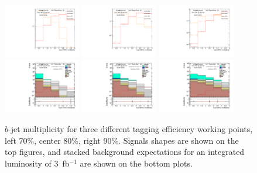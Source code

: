\begin{figure}[htb!!]
\begin{center}
\includegraphics[width=0.3\textwidth]{FIGURES/BTAGGING/02_CutLEP_ll_NB1JET_signals.pdf} 
\includegraphics[width=0.3\textwidth]{FIGURES/BTAGGING/02_CutLEP_ll_NB2JET_signals.pdf}
\includegraphics[width=0.3\textwidth]{FIGURES/BTAGGING/02_CutLEP_ll_NB3JET_signals.pdf}\\ 
\includegraphics[width=0.3\textwidth]{FIGURES/BTAGGING/05_CutSS_ll_NB1JET.pdf}
\includegraphics[width=0.3\textwidth]{FIGURES/BTAGGING/05_CutSS_ll_NB2JET.pdf}
\includegraphics[width=0.3\textwidth]{FIGURES/BTAGGING/05_CutSS_ll_NB3JET.pdf} 
\end{center}
\vspace{-0.2cm}
\caption{$b$-jet multiplicity for three different tagging efficiency working points, left 70\%, center 80\%, right 90\%.
Signals shapes are shown on the top figures, and stacked background expectations for an integrated luminosity of 3~fb$^{-1}$ are shown on the bottom plots.}
\label{fig:btagging}
\end{figure}

